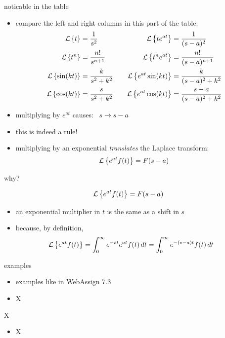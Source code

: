 \documentclass[urlcolor=blue,dvipsnames]{beamer}
\begin{document}
\begin{frame}{noticable in the table}

\begin{itemize}
\item compare the left and right columns in this part of the table:
\small
\begin{align*}
\mathcal{L}\left\{t\right\} &= \frac{1}{s^2}            &&& \mathcal{L}\left\{te^{at}\right\} &= \frac{1}{(s-a)^2} \\
\mathcal{L}\left\{t^n\right\} &= \frac{n!}{s^{n+1}}     &&& \mathcal{L}\left\{t^n e^{at}\right\} &= \frac{n!}{(s-a)^{n+1}} \\
\mathcal{L}\left\{\sin(kt)\right\} &= \frac{k}{s^2+k^2} &&& \mathcal{L}\left\{e^{at}\sin(kt)\right\} &= \frac{k}{(s-a)^2+k^2} \\
\mathcal{L}\left\{\cos(kt)\right\} &= \frac{s}{s^2+k^2} &&& \mathcal{L}\left\{e^{at}\cos(kt)\right\} &= \frac{s-a}{(s-a)^2+k^2}
\end{align*}
\item multiplying by $e^{at}$ causes: \, $s\to s-a$
\item this is indeed a rule!
\item multiplying by an exponential \emph{translates} the Laplace transform:
   $$\mathcal{L}\left\{e^{at} f(t)\right\} = F(s-a)$$
\end{itemize}
\end{frame}


\begin{frame}{why?}

    $$\mathcal{L}\left\{e^{at} f(t)\right\} = F(s-a)$$
\begin{itemize}
\item \alert{an exponential multiplier in $t$ is the same as a shift in $s$}
\item because, by definition,
\begin{align*}
\mathcal{L}\left\{e^{at} f(t)\right\} &= \int_0^\infty e^{-st} e^{at} f(t)\,dt = \int_0^\infty e^{-(s-a)t} f(t)\,dt
\end{align*}
\end{itemize}
\end{frame}


\begin{frame}{examples}

\begin{itemize}
\item examples like in WebAssign 7.3
\item X
\end{itemize}
\end{frame}


\begin{frame}{X}

\begin{itemize}
\item X
\end{itemize}
\end{frame}
\end{document}

